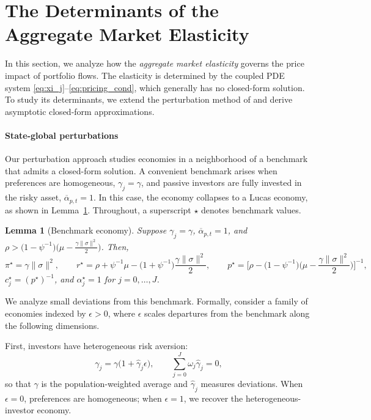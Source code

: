 \documentclass[12pt,english]{article}
\newtheorem{lemma}{Lemma}
\begin{document}
% 
\section{The Determinants of the Aggregate Market Elasticity}\label{sec:elasticity}

In this section, we analyze how the \emph{aggregate market elasticity} governs the price impact of portfolio flows.  
The elasticity is determined by the coupled PDE system \eqref{eq:xi_j}–\eqref{eq:pricing_cond}, which generally has no closed-form solution. To study its determinants, we extend the perturbation method of \citet{kogan2001risk} and derive asymptotic closed-form approximations.

\paragraph{State-global perturbations}

Our perturbation approach studies economies in a neighborhood of a benchmark that admits a closed-form solution.
A convenient benchmark arises when preferences are homogeneous, $\gamma_j=\gamma$, and passive investors are fully invested in the risky asset, $\overline{\alpha}_{p,t}=1$. In this case, the economy collapses to a Lucas economy, as shown in Lemma~\ref{lemma:benchmark}. Throughout, a superscript $\star$ denotes benchmark values.


\begin{lemma}[Benchmark economy]\label{lemma:benchmark}
Suppose $\gamma_j = \gamma$, $\overline{\alpha}_{p,t} = 1$, and $\rho>\big(1-\psi^{-1}\big)\big(\mu - \frac{\gamma \|\sigma\|^2}{2}\big)$. Then, 
\begin{equation}
        \pi^\star = \gamma \|\sigma\|^2, \qquad 
        r^\star = \rho + \psi^{-1}\mu - \big(1+\psi^{-1}\big)\frac{\gamma \|\sigma\|^2}{2}, \qquad 
        p^\star = \Big[\rho - \big(1-\psi^{-1}\big)\Big(\mu - \frac{\gamma \|\sigma\|^2}{2}\Big)\Big]^{-1},
\end{equation}
$c_{j}^\star = (p^\star)^{-1}$, and $\alpha_{j}^\star = 1$ for $j = 0, \ldots, J$.
\end{lemma}

We analyze small deviations from this benchmark. Formally, consider a family of economies indexed by $\epsilon>0$, where $\epsilon$ scales departures from the benchmark along the following dimensions.

First, investors have heterogeneous risk aversion:
\begin{equation}\label{eq:gamma-perturb}
    \gamma_j=\gamma\big(1+\hat{\gamma}_j\epsilon\big), 
    \qquad
    \sum_{j=0}^J \omega_j \hat{\gamma}_j=0,
\end{equation}
so that $\gamma$ is the population-weighted average and $\hat{\gamma}_j$ measures deviations. When $\epsilon=0$, preferences are homogeneous; when $\epsilon=1$, we recover the heterogeneous-investor economy.
\end{document}
